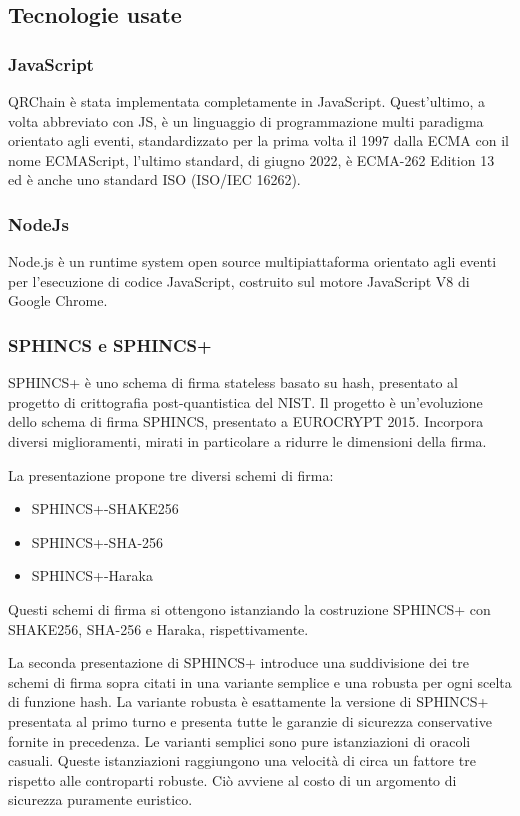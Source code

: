\subsection{Tecnologie usate}
\subsubsection{JavaScript}
QRChain è stata implementata completamente in JavaScript. Quest'ultimo, a volta abbreviato con JS, è un linguaggio di programmazione multi paradigma orientato agli eventi, standardizzato per la prima volta il 1997 dalla ECMA con il nome ECMAScript, l'ultimo standard, di giugno 2022, è ECMA-262 Edition 13 ed è anche uno standard ISO (ISO/IEC 16262).

\subsubsection{NodeJs}
Node.js è un runtime system open source multipiattaforma orientato agli eventi per l'esecuzione di codice JavaScript, costruito sul motore JavaScript V8 di Google Chrome.

\subsubsection{SPHINCS e SPHINCS+}
SPHINCS+ è uno schema di firma stateless basato su hash, presentato al progetto di crittografia post-quantistica del NIST. Il progetto è un'evoluzione dello schema di firma SPHINCS, presentato a EUROCRYPT 2015. Incorpora diversi miglioramenti, mirati in particolare a ridurre le dimensioni della firma.

La presentazione propone tre diversi schemi di firma:
\begin{itemize}
  \item SPHINCS+-SHAKE256
  \item SPHINCS+-SHA-256
  \item SPHINCS+-Haraka
\end{itemize}

Questi schemi di firma si ottengono istanziando la costruzione SPHINCS+ con SHAKE256, SHA-256 e Haraka, rispettivamente.

La seconda presentazione di SPHINCS+ introduce una suddivisione dei tre schemi di firma sopra citati in una variante semplice e una robusta per ogni scelta di funzione hash. La variante robusta è esattamente la versione di SPHINCS+ presentata al primo turno e presenta tutte le garanzie di sicurezza conservative fornite in precedenza. Le varianti semplici sono pure istanziazioni di oracoli casuali. Queste istanziazioni raggiungono una velocità di circa un fattore tre rispetto alle controparti robuste. Ciò avviene al costo di un argomento di sicurezza puramente euristico.